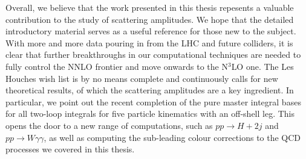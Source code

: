 \documentclass[main.tex]{subfiles}
\begin{document}
Overall, we believe that the work presented in this thesis repesents a valuable contribution to the study of scattering amplitudes. We hope that the detailed introductory material serves as a useful reference for those new to the subject. With more and more data pouring in from the LHC and future colliders, it is clear that further breakthroughs in our computational techniques are needed to fully control the NNLO frontier and move onwards to the N$^3$LO one. The Les Houches wish list is by no means complete and continuously calls for new theoretical results, of which the scattering amplitudes are a key ingredient. In particular, we point out the recent completion of the pure master integral bases for all two-loop integrals for five particle kinematics with an off-shell leg. This opens the door to a new range of computations, such as $pp \rightarrow H+2j$ and $pp \rightarrow W \gamma \gamma $, as well as computing the sub-leading colour corrections to the QCD processes we covered in this thesis.
\end{document}
